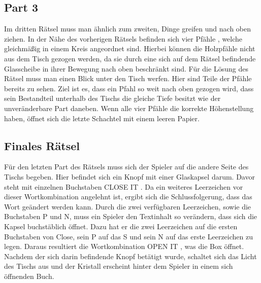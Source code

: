 \subsection{Part 3}
Im dritten Rätsel muss man ähnlich zum zweiten, Dinge greifen und nach oben ziehen. In der Nähe des vorherigen Rätsels befinden sich vier Pfähle , welche gleichmäßig in einem Kreis angeordnet sind. Hierbei können die Holzpfähle nicht aus dem Tisch gezogen werden, da sie durch eine sich auf dem Rätsel befindende Glasscheibe in ihrer Bewegung nach oben beschränkt sind. Für die Lösung des Rätsel muss man einen Blick unter den Tisch werfen. Hier sind Teile der Pfähle bereits zu sehen. Ziel ist es, dass ein Pfahl so weit nach oben gezogen wird, dass sein Bestandteil unterhalb des Tischs die gleiche Tiefe besitzt wie der unveränderbare Part daneben. Wenn alle vier Pfähle die korrekte Höhenstellung haben, öffnet sich die letzte Schachtel mit einem leeren Papier.
\subsection{Finales Rätsel}
Für den letzten Part des Rätsels muss sich der Spieler auf die andere Seite des Tischs begeben. Hier befindet sich ein Knopf mit einer Glaskapsel darum. Davor steht mit einzelnen Buchstaben \dq CLOSE  IT \dq. Da ein weiteres Leerzeichen vor dieser Wortkombination angelehnt ist, ergibt sich die Schlussfolgerung, dass das Wort geändert werden kann. Durch die zwei verfügbaren Leerzeichen, sowie die Buchstaben P und N, muss ein Spieler den Textinhalt so verändern, dass sich die Kapsel buchstäblich öffnet. Dazu hat er die zwei Leerzeichen auf die ersten Buchstaben von Close, sein P auf das S und sein N auf das erste Leerzeichen zu legen. Daraus resultiert die Wortkombination \dq OPEN IT \dq, was die Box öffnet. Nachdem der sich darin befindende Knopf betätigt wurde, schaltet sich das Licht des Tischs aus und der Kristall erscheint hinter dem Spieler in einem sich öffnenden Buch.


